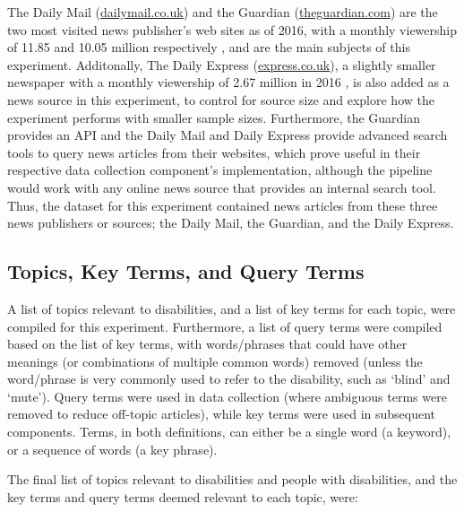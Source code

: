 \documentclass{report}
\begin{document}
The Daily Mail (\url{dailymail.co.uk}) and the Guardian (\url{theguardian.com}) are the two most visited news publisher's web sites as of 2016, with a monthly viewership of 11.85 and 10.05 million respectively \cite{statista2018newspaper}, and are the main subjects of this experiment.
Additonally, The Daily Express (\url{express.co.uk}), a slightly smaller newspaper with a monthly viewership of 2.67 million in 2016 \cite{statista2018newspaper}, is also added as a news source in this experiment, to control for source size and explore how the experiment performs with smaller sample sizes.
Furthermore, the Guardian provides an API \cite{guardian} and the Daily Mail and Daily Express provide advanced search tools \cite{daily-mail, daily-express} to query news articles from their websites, which prove useful in their respective data collection component's implementation, although the pipeline would work with any online news source that provides an internal search tool.
Thus, the dataset for this experiment contained news articles from these three news publishers or sources; the Daily Mail, the Guardian, and the Daily Express.

\subsection{Topics, Key Terms, and Query Terms} \label{topics}

A list of topics relevant to disabilities, and a list of key terms for each topic, were compiled for this experiment.
Furthermore, a list of query terms were compiled based on the list of key terms, with words/phrases that could have other meanings (or combinations of multiple common words) removed (unless the word/phrase is very commonly used to refer to the disability, such as `blind' and `mute').
Query terms were used in data collection (where ambiguous terms were removed to reduce off-topic articles), while key terms were used in subsequent components.
Terms, in both definitions, can either be a single word (a keyword), or a sequence of words (a key phrase).

The final list of topics relevant to disabilities and people with disabilities, and the key terms and query terms deemed relevant to each topic, were: 
\end{document}
